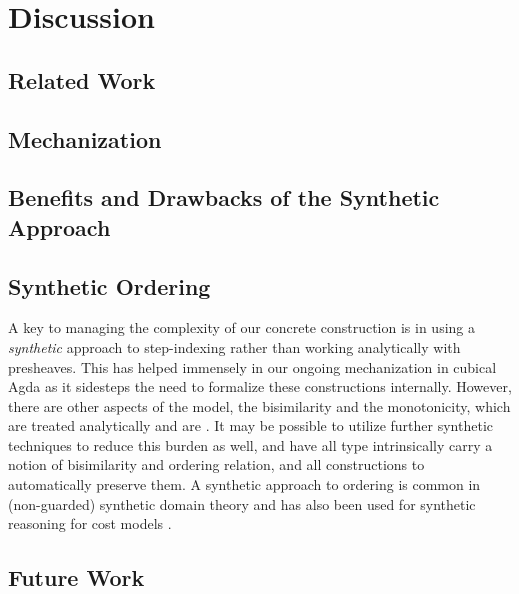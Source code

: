\section{Discussion}

\subsection{Related Work}


\subsection{Mechanization}

\subsection{Benefits and Drawbacks of the Synthetic Approach}

\subsection{Synthetic Ordering}

A key to managing the complexity of our concrete construction is in
using a \emph{synthetic} approach to step-indexing rather than working
analytically with presheaves. This has helped immensely in our ongoing
mechanization in cubical Agda as it sidesteps the need to formalize
these constructions internally. 
%
However, there are other aspects of the model, the bisimilarity and
the monotonicity, which are treated analytically and are .
%
It may be possible to utilize further synthetic techniques to reduce
this burden as well, and have all type intrinsically carry a notion of
bisimilarity and ordering relation, and all constructions to
automatically preserve them.
%
A synthetic approach to ordering is common in (non-guarded) synthetic
domain theory and has also been used for synthetic reasoning for cost
models \cite{synthetic-domain-theory,decalf}.

\subsection{Future Work}


